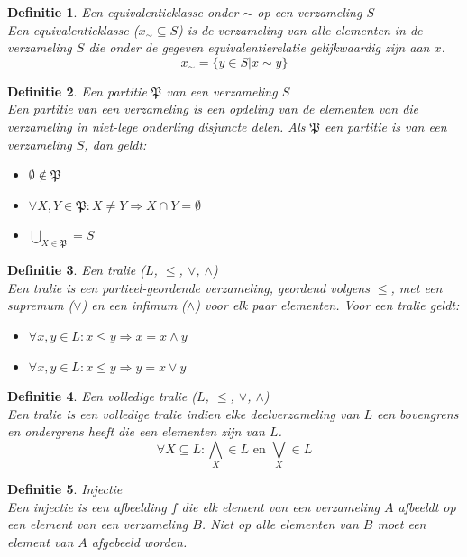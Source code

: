 \documentclass[a4paper]{article}
\newtheorem{tdefinitie}{Definitie}[section]
\newenvironment{definitie}[1]%
  {\begin{mdframed}[backgroundcolor=silver,
    topline=false,
    rightline=false,
    leftline=false,
    bottomline=false]\begin{tdefinitie}#1\\\normalfont}%
  {\end{tdefinitie}\end{mdframed}}
\newcommand{\partition}{\ensuremath{\mathfrak{P}}}
\newcommand{\en}{\ensuremath{\text{ en }}}
\begin{document}
\begin{definitie}{Een equivalentieklasse onder $\sim$ op een verzameling $S$}
  Een equivalentieklasse ($x_\sim \subseteq S$) is de verzameling van alle elementen in de verzameling $S$ die onder de gegeven equivalentierelatie gelijkwaardig zijn aan $x$.
  \begin{equation*}
  x_\sim = \{y \in S|x \sim y\}
  \end{equation*}
\end{definitie}

\begin{definitie}{Een partitie $\partition$ van een verzameling $S$}
  Een partitie van een verzameling is een opdeling van de elementen van die verzameling in niet-lege onderling disjuncte delen. Als $\partition$ een partitie is van een verzameling $S$, dan geldt:
  \begin{itemize}
  \item $\emptyset \notin \partition$
  \item $\forall X, Y \in \partition: X \neq Y \Rightarrow X \cap Y = \emptyset$
  \item $\bigcup_{X \in \partition} = S$
  \end{itemize}
\end{definitie}

\begin{definitie}{Een tralie ($L$, $\leq$, $\vee$, $\wedge$)}
  Een tralie is een partieel-geordende verzameling, geordend volgens $\leq$, met een supremum ($\vee$) en een infimum ($\wedge$) voor elk paar elementen. Voor een tralie geldt:
  \begin{itemize}
  \item $\forall x, y \in L: x \leq y \Rightarrow x = x \wedge y$
  \item $\forall x, y \in L: x \leq y \Rightarrow y = x \vee y$
  \end{itemize}
\end{definitie}

\begin{definitie}{Een volledige tralie ($L$, $\leq$, $\vee$, $\wedge$)}
  Een tralie is een volledige tralie indien elke deelverzameling van $L$ een bovengrens en ondergrens heeft die een elementen zijn van $L$.
  \begin{equation*}
  \forall X \subseteq L: \bigwedge_X \in L \en \bigvee_X \in L
  \end{equation*}
\end{definitie}

\begin{definitie}{Injectie}
  \label{def:inj}
  Een injectie is een afbeelding $f$ die elk element van een verzameling $A$ afbeeldt op een element van een verzameling $B$. Niet op alle elementen van $B$ moet een element van $A$ afgebeeld worden.
\end{definitie}
\end{document}
